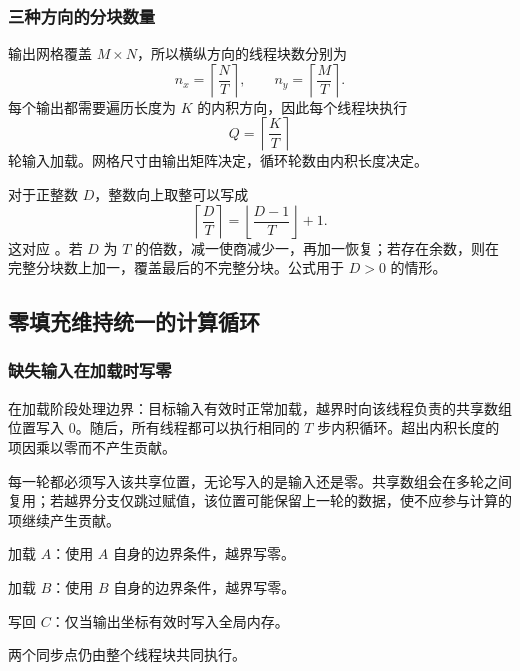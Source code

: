\subsubsection{三种方向的分块数量}
输出网格覆盖 $M\times N$，所以横纵方向的线程块数分别为
\begin{equation}
 n_x=\left\lceil\frac{N}{T}\right\rceil,\qquad
 n_y=\left\lceil\frac{M}{T}\right\rceil.
\end{equation}
每个输出都需要遍历长度为 $K$ 的内积方向，因此每个线程块执行
\begin{equation}
 Q=\left\lceil\frac{K}{T}\right\rceil
 \label{l6:eq:tile-count}
\end{equation}
轮输入加载。网格尺寸由输出矩阵决定，循环轮数由内积长度决定。

对于正整数 $D$，整数向上取整可以写成
\begin{equation}
 \left\lceil\frac{D}{T}\right\rceil
 =\left\lfloor\frac{D-1}{T}\right\rfloor+1.
 \label{l6:eq:ceil}
\end{equation}
这对应 。若 $D$ 为 $T$ 的倍数，减一使商减少一，再加一恢复；若存在余数，则在完整分块数上加一，覆盖最后的不完整分块。公式用于 $D>0$ 的情形。

\subsection{零填充维持统一的计算循环}
\subsubsection{缺失输入在加载时写零}
 在加载阶段处理边界：目标输入有效时正常加载，越界时向该线程负责的共享数组位置写入 $0$。随后，所有线程都可以执行相同的 $T$ 步内积循环。超出内积长度的项因乘以零而不产生贡献。

每一轮都必须写入该共享位置，无论写入的是输入还是零。共享数组会在多轮之间复用；若越界分支仅跳过赋值，该位置可能保留上一轮的数据，使不应参与计算的项继续产生贡献。

\begin{keybox}[title={零填充的三个动作}]
加载 $A$：使用 $A$ 自身的边界条件，越界写零。\par
加载 $B$：使用 $B$ 自身的边界条件，越界写零。\par
写回 $C$：仅当输出坐标有效时写入全局内存。\par
两个同步点仍由整个线程块共同执行。
\end{keybox}

